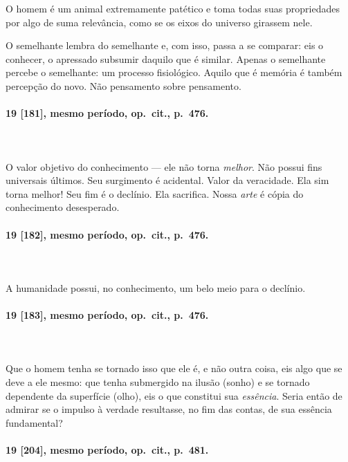 O homem é um animal extremamente patético e toma todas suas propriedades
por algo de suma relevância, como se os eixos do universo girassem
nele.

O semelhante lembra do semelhante e, com isso, passa a se comparar: eis
o conhecer, o apressado subsumir daquilo que é similar. Apenas o
semelhante percebe o semelhante: um processo fisiológico. Aquilo que é
memória é também percepção do novo. Não pensamento sobre pensamento.

\pagebreak
\paragraph*{19 [181], mesmo período, op.~cit., p.~476.}
\ \\
\ \\

O valor objetivo do conhecimento --- ele não torna \textit{melhor}. Não
possui fins universais últimos. Seu surgimento é acidental. Valor da
veracidade. Ela sim torna melhor! Seu fim é o declínio. Ela
sacrifica. Nossa \textit{arte} é cópia do conhecimento desesperado.

\pagebreak
\paragraph*{19 [182], mesmo período, op.~cit., p.~476.}
\ \\
\ \\

A humanidade possui, no conhecimento, um belo meio para o declínio. 

\pagebreak
\paragraph*{19 [183], mesmo período, op.~cit., p.~476.}
\ \\
\ \\

Que o homem tenha se tornado isso que ele é, e não outra coisa, eis
algo que se deve a ele mesmo: que tenha submergido na ilusão
(sonho) e se tornado dependente da superfície (olho), eis o que
constitui sua \textit{essência}. Seria então de admirar se o impulso à
verdade resultasse, no fim das contas, de sua essência fundamental? 

\pagebreak
\paragraph*{19 [204], mesmo período, op.~cit., p.~481.}
\ \\
\ \\

